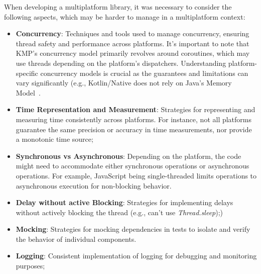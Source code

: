When developing a multiplatform library, it was necessary to consider the following aspects, which may be harder to manage in a multiplatform context:

\begin{itemize}
    \item \textbf{Concurrency}: Techniques and tools used to manage concurrency,
    ensuring thread safety and performance across platforms.
    It's important to note that KMP's concurrency model primarily revolves around coroutines,
    which may use threads depending on the platform's dispatchers.
    Understanding platform-specific concurrency models is crucial
    as the guarantees and limitations can vary significantly
    (e.g., Kotlin/Native does not rely on Java's Memory Model~\cite{java-memory-model}.
    \item \textbf{Time Representation and Measurement}:
    Strategies for representing and measuring time consistently across platforms.
    For instance, not all platforms guarantee the same precision or accuracy in time measurements, nor provide a monotonic time source;
    \item \textbf{Synchronous vs Asynchronous}: Depending on the platform, the code might need to accommodate either synchronous operations or asynchronous operations.
    For example, JavaScript being single-threaded limits operations to asynchronous execution for non-blocking behavior.
    \item \textbf{Delay without active Blocking}: Strategies for implementing delays without actively blocking the thread (e.g., can't use \textit{Thread.sleep});)
    \item \textbf{Mocking}: Strategies for mocking dependencies in tests to isolate and verify the behavior of individual components.
    \item \textbf{Logging}: Consistent implementation of logging for debugging and monitoring purposes;
\end{itemize}
